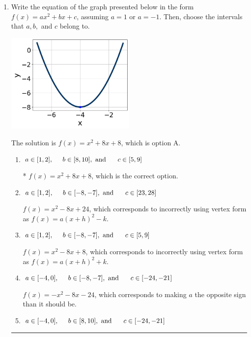 \documentclass{extbook}[14pt]
\newcommand{\litem}[1]{\item #1

\rule{\textwidth}{0.4pt}}
\begin{document}
\begin{enumerate}\litem{
Write the equation of the graph presented below in the form $f(x)=ax^2+bx+c$, assuming  $a=1$ or $a=-1$. Then, choose the intervals that $a, b,$ and $c$ belong to.

\begin{center}
    \includegraphics[width=0.5\textwidth]{../Figures/quadraticGraphToEquationC.png}
\end{center}




The solution is \( f(x) = x^{2} +8 x + 8 \), which is option A.\begin{enumerate}[label=\Alph*.]
\item \( a \in [1, 2], \hspace*{5mm} b \in [8, 10], \text{ and } \hspace*{5mm} c \in [5, 9] \)

* $f(x)=x^{2} +8 x + 8$, which is the correct option.
\item \( a \in [1, 2], \hspace*{5mm} b \in [-8, -7], \text{ and } \hspace*{5mm} c \in [23, 28] \)

$f(x)=x^{2} -8 x + 24$, which corresponds to incorrectly using vertex form as $f(x) = a(x+h)^2 - k$.
\item \( a \in [1, 2], \hspace*{5mm} b \in [-8, -7], \text{ and } \hspace*{5mm} c \in [5, 9] \)

$f(x)=x^{2} -8 x + 8$, which corresponds to incorrectly using vertex form as $f(x) = a(x+h)^2+k$.
\item \( a \in [-4, 0], \hspace*{5mm} b \in [-8, -7], \text{ and } \hspace*{5mm} c \in [-24, -21] \)

$f(x)=-x^{2} -8 x -24$, which corresponds to making $a$ the opposite sign than it should be.
\item \( a \in [-4, 0], \hspace*{5mm} b \in [8, 10], \text{ and } \hspace*{5mm} c \in [-24, -21] \)


\end{enumerate}}
\end{enumerate}
\end{document}
